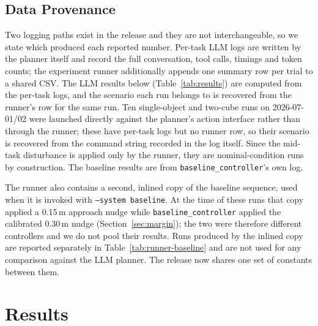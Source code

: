 \documentclass[conference]{IEEEtran}
\begin{document}
\subsection{Data Provenance}
\label{sec:provenance}

Two logging paths exist in the release and they are not interchangeable, so
we state which produced each reported number. Per-task LLM logs are written
by the planner itself and record the full conversation, tool calls, timings
and token counts; the experiment runner additionally appends one summary row
per trial to a shared CSV. The LLM results below
(Table~\ref{tab:results}) are computed from the per-task logs, and the scenario each run belongs to is recovered from the
runner's row for the same run. Ten single-object and two-cube runs on
2026-07-01/02 were launched directly against the planner's action interface
rather than through the runner; these have per-task logs but no runner row,
so their scenario is recovered from the command string recorded in the log
itself. Since the mid-task disturbance is applied only by the runner, they
are nominal-condition runs by construction. The baseline results are from
\texttt{baseline\_controller}'s own log.

The runner also contains a second, inlined copy of the baseline sequence,
used when it is invoked with \texttt{--system baseline}. At the time of
these runs that copy applied a 0.15\,m approach nudge while
\texttt{baseline\_controller} applied the calibrated 0.30\,m nudge
(Section~\ref{sec:margin}); the two were therefore different controllers and
we do not pool their results. Runs produced by the inlined copy are reported
separately in Table~\ref{tab:runner-baseline} and are not used for any
comparison against the LLM planner. The release now shares one set of
constants between them.

\section{Results}
\label{sec:results}
\end{document}
